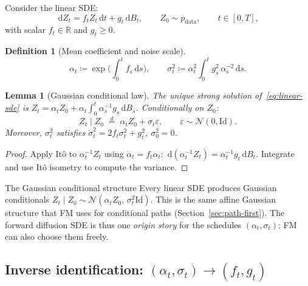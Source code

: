 \documentclass[11pt]{article}
\newcommand{\R}{\mathbb{R}}
\newcommand{\cN}{\mathcal{N}}
\newcommand{\Id}{\mathrm{Id}}
\newcommand{\dd}{\,\mathrm{d}}
\newtheorem{lemma}[theorem]{Lemma}
\theoremstyle{definition}
\newtheorem{definition}[theorem]{Definition}
\theoremstyle{remark}
\begin{document}
Consider the linear SDE:
\begin{equation}\label{eq:linear-sde}
\dd Z_t = f_t Z_t\dd t + g_t\dd B_t, \qquad Z_0\sim p_{\mathrm{data}},\qquad t\in[0,T],
\end{equation}
with scalar $f_t\in\R$ and $g_t\ge 0$.

\begin{definition}[Mean coefficient and noise scale]\label{def:alpha-sigma-sde}
\begin{equation}\label{eq:alpha-sde}
\alpha_t \coloneqq \exp\!\Big(\int_0^t f_s\dd s\Big), \qquad
\sigma_t^2 \coloneqq \alpha_t^2\int_0^t g_s^2\,\alpha_s^{-2}\dd s.
\end{equation}
\end{definition}

\begin{lemma}[Gaussian conditional law]\label{lem:linear-sde-gauss}
The unique strong solution of~\eqref{eq:linear-sde} is $Z_t = \alpha_t Z_0 + \alpha_t\int_0^t \alpha_s^{-1}g_s\dd B_s$.
Conditionally on $Z_0$:
\begin{equation}\label{eq:linear-cond}
Z_t\mid Z_0 \;\stackrel{d}{=}\; \alpha_t Z_0 + \sigma_t\varepsilon, \qquad \varepsilon\sim\cN(0,\Id).
\end{equation}
Moreover, $\sigma_t^2$ satisfies $\dot\sigma_t^2 = 2f_t\sigma_t^2 + g_t^2$, $\sigma_0^2 = 0$.
\end{lemma}

\begin{proof}
Apply It\^o to $\alpha_t^{-1}Z_t$ using $\dot\alpha_t = f_t\alpha_t$:
$\dd(\alpha_t^{-1}Z_t) = \alpha_t^{-1}g_t\dd B_t$.
Integrate and use It\^o isometry to compute the variance.
\end{proof}

\begin{keybox}{The Gaussian conditional structure}
Every linear SDE produces Gaussian conditionals $Z_t\mid Z_0 \sim \cN(\alpha_t Z_0,\,\sigma_t^2\Id)$.
This is the same affine Gaussian structure that FM uses for conditional paths (Section~\ref{sec:path-first}).
The forward diffusion SDE is thus one \emph{origin story} for the schedules $(\alpha_t,\sigma_t)$; FM can also choose them freely.
\end{keybox}

\subsection{Inverse identification: $(\alpha_t,\sigma_t) \to (f_t,g_t)$}
\end{document}
